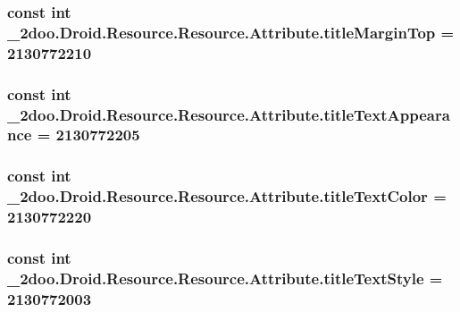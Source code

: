 \hypertarget{class__2doo_1_1_droid_1_1_resource_1_1_attribute_21a0247af61b502887e4f03c8fdb8f30}{
\subsubsection[{titleMarginTop}]{\setlength{\rightskip}{0pt plus 5cm}const int \_\-2doo.Droid.Resource.Resource.Attribute.titleMarginTop = 2130772210}}
\label{class__2doo_1_1_droid_1_1_resource_1_1_attribute_21a0247af61b502887e4f03c8fdb8f30}


\hypertarget{class__2doo_1_1_droid_1_1_resource_1_1_attribute_6de51b5b7f6293949d19f861edd10039}{
\subsubsection[{titleTextAppearance}]{\setlength{\rightskip}{0pt plus 5cm}const int \_\-2doo.Droid.Resource.Resource.Attribute.titleTextAppearance = 2130772205}}
\label{class__2doo_1_1_droid_1_1_resource_1_1_attribute_6de51b5b7f6293949d19f861edd10039}


\hypertarget{class__2doo_1_1_droid_1_1_resource_1_1_attribute_7faadf27a51783f1d33018efd4200ded}{
\subsubsection[{titleTextColor}]{\setlength{\rightskip}{0pt plus 5cm}const int \_\-2doo.Droid.Resource.Resource.Attribute.titleTextColor = 2130772220}}
\label{class__2doo_1_1_droid_1_1_resource_1_1_attribute_7faadf27a51783f1d33018efd4200ded}


\hypertarget{class__2doo_1_1_droid_1_1_resource_1_1_attribute_bb14f4a9328498a1dbd645473b95c0d0}{
\subsubsection[{titleTextStyle}]{\setlength{\rightskip}{0pt plus 5cm}const int \_\-2doo.Droid.Resource.Resource.Attribute.titleTextStyle = 2130772003}}
\label{class__2doo_1_1_droid_1_1_resource_1_1_attribute_bb14f4a9328498a1dbd645473b95c0d0}


